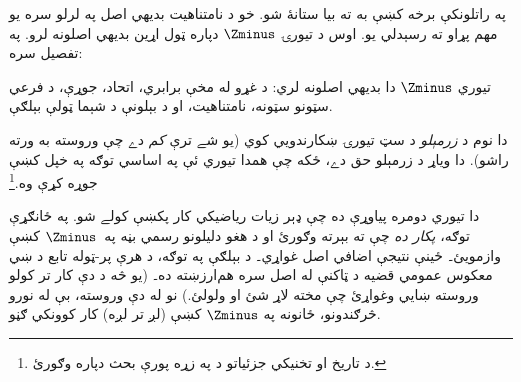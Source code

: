 \documentclass[../../../include/open-logic-section]{subfiles}
\begin{document}

په راتلونکې برخه کښې به \stagesinf{} ته بيا ستانۀ شو.
خو د نامتناهيت بديهي اصل په لرلو سره يو مهم پړاو ته رسېدلي يو.
اوس د تيورۍ $\Zminus$ دپاره ټول اړين بديهي اصلونه لرو.
په تفصيل سره:

\begin{defn}
تيوري $\Zminus$ دا بديهي اصلونه لري: د غړو له مخې برابري،
اتحاد، جوړې، د فرعي سټونو سټونه، نامتناهيت، او د بېلونې د
شېما ټولې بېلګې.
\end{defn}

دا نوم د \emph{زرمېلو} د سټ تيورۍ ښکارندويي کوي (يو شے ترې
\emph{کم} دے چې وروسته به ورته راشو). دا وياړ د زرمېلو حق دے،
ځکه چې همدا تيوري ئې په اساسي توګه په خپل
\citeyear{Zermelo1908Untersuchungen} کښې جوړه کړې وه.\footnote{د تاريخ
او تخنيکي جزئياتو د په زړه پورې بحث دپاره \citet[Appendix
A]{Potter2004} وګورئ.}

دا تيوري دومره پياوړې ده چې ډېر زيات رياضيکي کار پکښې کولے شو.
په ځانګړې توګه، \emph{پکار ده} چې  ته بېرته
وګورئ او د هغو دليلونو رسمي بڼه په~$\Zminus$ کښې وازمويئ۔
ځينې نتيجې اضافي اصل غواړي۔ د بېلګې په توګه، د هرې پر-ټوله
تابع د ښي معکوس عمومي قضيه د ټاکنې له اصل سره هم‌ارزښته ده۔ (يو څه د دې کار تر
کولو وروسته ښايي وغواړئ چې مخته لاړ شئ او
 ولولئ.) نو له دې وروسته،
بې له نورو څرګندونو، ځانونه په $\Zminus$ کښې (لږ تر لږه) کار کوونکي ګڼو.
\end{document}

